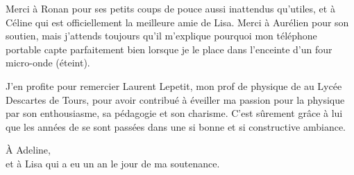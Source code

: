 \begin{ThesisAcknowledgments}
Merci à Ronan pour ses petits coups de pouce aussi inattendus qu'utiles, et à Céline qui est officiellement la meilleure amie de Lisa. Merci à Aurélien pour son soutien, mais j'attends toujours qu'il m'explique pourquoi mon téléphone portable capte parfaitement bien lorsque je le place dans l'enceinte d'un four micro-onde (éteint).

J'en profite pour remercier Laurent Lepetit, mon prof de physique de  au Lycée Descartes de Tours, pour avoir contribué à éveiller ma passion pour la physique par son enthousiasme, sa pédagogie et son charisme. C'est sûrement grâce à lui que les années de  se sont passées dans une si bonne et si constructive ambiance.




\end{ThesisAcknowledgments}


\begin{ThesisDedication}
\`A Adeline,\\
et à Lisa qui a eu un an le jour de ma soutenance.
\end{ThesisDedication}


